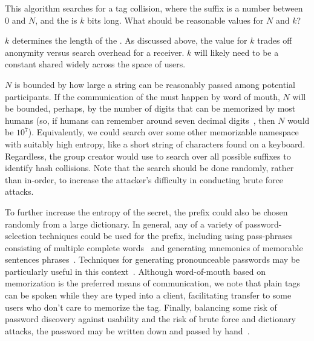 %
This algorithm searches for a tag collision, where the  suffix is
a number between 0 and $N$, and the  is $k$ bits long.
What should be reasonable values for $N$ and $k$?

$k$ determines the length of the . As discussed above, the value for $k$
trades off anonymity versus search overhead for a receiver. $k$ will likely need to be
a constant shared widely across the space of \hoot users.

$N$ is bounded by how large a  string can be reasonably
passed among potential \hoot participants. If the communication of the
 must happen by word of mouth, $N$ will be bounded,
perhaps, by the number of digits that can be memorized by most humans
(so, if humans can remember around seven decimal
digits~\cite{miller56}, then $N$ would be $10^7$). Equivalently, we
could search over some other memorizable namespace with suitably high
entropy, like a short string of characters found on a keyboard.
Regardless, the group creator would use  to search over all possible suffixes to
identify hash collisions. Note that the search should be done
randomly, rather than in-order, to increase the attacker's difficulty
in conducting brute force attacks. 

To further increase the entropy of the secret, the prefix could also be
chosen randomly from a large dictionary. In general, any of a variety of
password-selection techniques could be used for the prefix, including
using pass-phrases consisting of multiple complete
words~\cite{passphrase} and generating mnemonics of memorable sentences
phrases~\cite{mnemonics}. Techniques for generating pronounceable
passwords may be particularly useful in this
context~\cite{gasser}. Although word-of-mouth based on memorization is
the preferred means of communication, we note that plain tags can be
spoken while they are typed into a \hoot client, facilitating transfer to
some users who don't care to memorize the tag. Finally, balancing some
risk of password discovery against usability and the risk of brute force
and dictionary attacks, the password may be written down and passed by
hand~\cite{written-passwords}.

